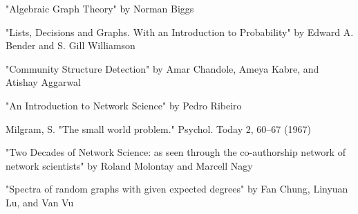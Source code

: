 \documentclass{article}
\begin{document}
\bigskip 

\noindent "Algebraic Graph Theory" by Norman Biggs

\bigskip 

\noindent "Lists, Decisions and Graphs. With an Introduction to Probability" by Edward A. Bender and S. Gill Williamson

\bigskip 

\noindent "Community Structure Detection" by Amar Chandole, Ameya Kabre, and \linebreak Atishay Aggarwal

\bigskip

\noindent "An Introduction to Network Science" by Pedro Ribeiro

\bigskip

\noindent Milgram, S. "The small world problem." Psychol. Today 2, 60–67 (1967)

\bigskip

\noindent "Two Decades of Network Science: as seen through the co-authorship network of network scientists" by Roland Molontay and Marcell Nagy

\bigskip 

\noindent "Spectra of random graphs with given expected degrees" by Fan Chung, Linyuan Lu, and Van Vu




\end{document}
